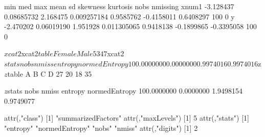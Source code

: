 \begin{Schunk}
\begin{Soutput}
            min        med      max        mean        sd   skewness   kurtosis nobs nmissing
xnum1 -3.128437 0.08685732 2.168475 0.009257184 0.9585762 -0.4158011  0.6408297  100        0
y     -2.470202 0.06019190 1.951928 0.011305065 0.9418138 -0.1899865 -0.3395058  100        0
\end{Soutput}
\begin{Soutput}
$xcat2
$xcat2$table
Female   Male 
    53     47 

$xcat2$stats
         nobs         nmiss       entropy normedEntropy 
  100.0000000     0.0000000     0.9974016     0.9974016 


$z
$z$table
 A  B  C  D 
27 20 18 35 

$z$stats
         nobs         nmiss       entropy normedEntropy 
  100.0000000     0.0000000     1.9498154     0.9749077 


attr(,"class")
[1] "summarizedFactors"
attr(,"maxLevels")
[1] 5
attr(,"stats")
[1] "entropy"       "normedEntropy" "nobs"          "nmiss"        
attr(,"digits")
[1] 2
\end{Soutput}
\end{Schunk}

